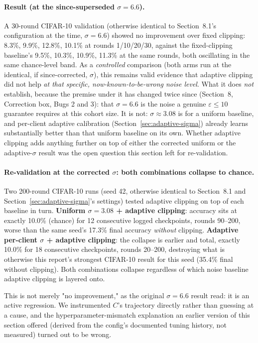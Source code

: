 \documentclass[12pt,a4paper]{article}
\begin{document}
\paragraph{Result (at the since-superseded $\sigma=6.6$).} A 30-round
CIFAR-10 validation (otherwise identical to Section~8.1's configuration at
the time, $\sigma=6.6$) showed no improvement over fixed clipping: 8.3\%,
9.9\%, 12.8\%, 10.1\% at rounds 1/10/20/30, against the fixed-clipping
baseline's 9.5\%, 10.3\%, 10.9\%, 11.3\% at the same rounds, both
oscillating in the same chance-level band. As a \emph{controlled}
comparison (both arms run at the identical, if since-corrected, $\sigma$),
this remains valid evidence that adaptive clipping did not help
\emph{at that specific, now-known-to-be-wrong noise level}. What it does
\emph{not} establish, because the premise under it has changed twice
since (Section~8, Correction box, Bugs 2 and 3): that $\sigma=6.6$ is the
noise a genuine $\varepsilon\le10$ guarantee requires at this cohort size.
It is not: $\sigma\approx3.08$ is for a uniform baseline, and
per-client adaptive calibration (Section~\ref{sec:adaptive-sigma}) already
learns substantially better than that uniform baseline on its own.
Whether adaptive clipping adds anything further on top of either the
corrected uniform or the adaptive-$\sigma$ result was the open question
this section left for re-validation.

\paragraph{Re-validation at the corrected $\sigma$: both combinations
collapse to chance.} Two 200-round CIFAR-10 runs (seed 42, otherwise
identical to Section~8.1 and Section~\ref{sec:adaptive-sigma}'s
settings) tested adaptive clipping on top of each baseline in turn.
\textbf{Uniform $\sigma=3.08$ + adaptive clipping}: accuracy sits at
exactly 10.0\% (chance) for 12 consecutive logged checkpoints, rounds
90--200, worse than the same seed's 17.3\% final accuracy \emph{without}
clipping. \textbf{Adaptive per-client $\sigma$ + adaptive clipping}:
the collapse is earlier and total, exactly 10.0\% for 18 consecutive
checkpoints, rounds 20--200, destroying what is otherwise this report's
strongest CIFAR-10 result for this seed (35.4\% final without
clipping). Both combinations collapse regardless of which noise
baseline adaptive clipping is layered onto.

This is not merely "no improvement," as the original $\sigma=6.6$
result read: it is an active regression. We instrumented $C$'s
trajectory directly rather than guessing at a cause, and the
hyperparameter-mismatch explanation an earlier version of this section
offered (derived from the config's documented tuning history, not
measured) turned out to be wrong.
\end{document}
